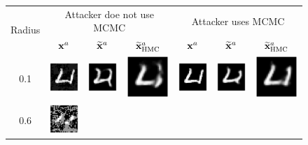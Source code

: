 \begin{figure}[h]%
    \centering
    \begin{tabular}{cccc|ccc}
    \multirow{2}{*}{Radius} & \multicolumn{3}{c|}{Attacker doe not use MCMC} & \multicolumn{3}{c}{Attacker uses MCMC} \\
        & ${\mathbf{x}}^a$ & $\widetilde{{\mathbf{x}}}^a$ & $\widetilde{{\mathbf{x}}}^a_{\text{HMC}}$ & ${\mathbf{x}}^a$ & $\widetilde{{\mathbf{x}}}^a$ & $\widetilde{{\mathbf{x}}}^a_{\text{HMC}}$ \\
        0.1 & \includegraphics[width=0.1\linewidth]{pics/3_adv_att/mnist_MCMC/mnist_noMCMC_adv_0_rad_0.1.pdf} &
        \includegraphics[width=0.1\linewidth]{pics/3_adv_att/mnist_MCMC/mnist_noMCMC_adv_rec_0_rad_0.1.pdf} &
        \includegraphics[width=0.1\linewidth]{pics/3_adv_att/mnist_MCMC/mnist_noMCMC_adv_rec_t_0_rad_0.1.pdf} &
        \includegraphics[width=0.1\linewidth]{pics/3_adv_att/mnist_MCMC/mnist_MCMC_adv_0_rad_0.1.pdf} &
        \includegraphics[width=0.1\linewidth]{pics/3_adv_att/mnist_MCMC/mnist_MCMC_adv_rec_0_rad_0.1.pdf} &
        \includegraphics[width=0.1\linewidth]{pics/3_adv_att/mnist_MCMC/mnist_MCMC_adv_rec_t_0_rad_0.1.pdf}\\ 
        0.6 & \includegraphics[width=0.1\linewidth]{pics/3_adv_att/mnist_MCMC/mnist_noMCMC_adv_0_rad_0.6.pdf} &

\end{tabular}
\end{figure}

